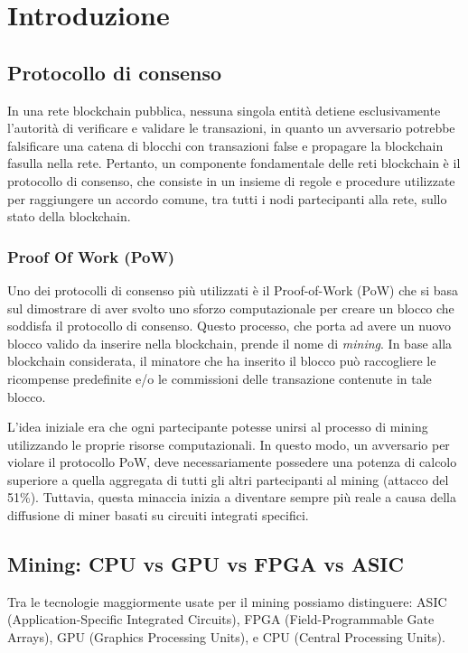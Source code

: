 \chapter{Introduzione}
\section{Protocollo di consenso}
In una rete blockchain pubblica, nessuna singola entità detiene esclusivamente l'autorità di verificare e validare le transazioni, in quanto un avversario potrebbe falsificare una catena di blocchi con transazioni false e propagare la blockchain fasulla nella rete. 
Pertanto, un componente fondamentale delle reti blockchain è il protocollo di consenso, che consiste in un insieme di regole e procedure utilizzate per raggiungere un accordo comune, tra tutti i nodi partecipanti alla rete, sullo stato della blockchain.

\subsection{Proof Of Work (PoW)}
Uno dei protocolli di consenso più utilizzati è il Proof-of-Work (PoW) che si basa sul dimostrare di aver svolto uno sforzo computazionale per creare un blocco che soddisfa il protocollo di consenso. 
Questo processo, che porta ad avere un nuovo blocco valido da inserire nella blockchain, prende il nome di \textit{mining}.
In base alla blockchain considerata, il minatore che ha inserito il blocco può raccogliere le ricompense predefinite e/o le commissioni delle transazione contenute in tale blocco.

L'idea iniziale era che ogni partecipante potesse unirsi al processo di mining utilizzando le proprie risorse computazionali. 
In questo modo, un avversario per violare il protocollo PoW, deve necessariamente possedere una potenza di calcolo superiore a quella aggregata di tutti gli altri partecipanti al mining (attacco del 51\%). 
Tuttavia, questa minaccia inizia a diventare sempre più reale a causa della diffusione di miner basati su circuiti integrati specifici. 


\section{Mining: CPU vs GPU vs FPGA vs ASIC}
Tra le tecnologie maggiormente usate per il mining possiamo distinguere: ASIC (Application-Specific Integrated Circuits), FPGA (Field-Programmable Gate Arrays), GPU (Graphics Processing Units), e CPU (Central Processing Units). 

